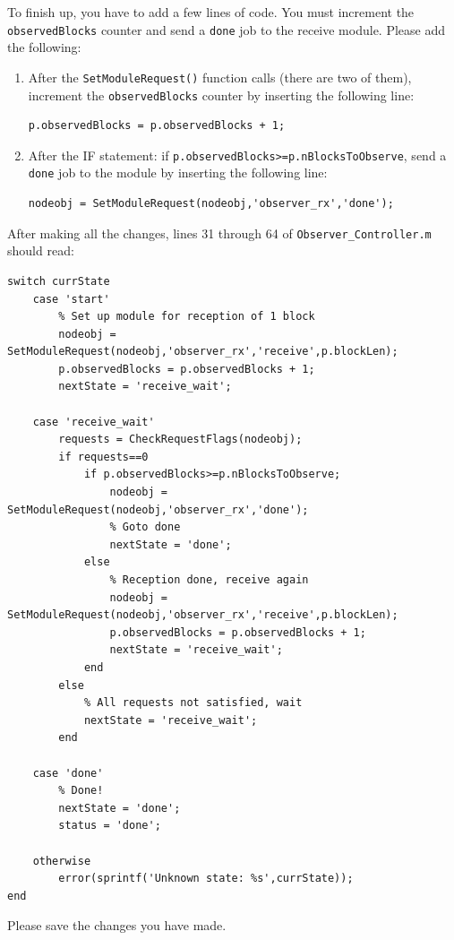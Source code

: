 To finish up, you have to add a few lines of code.  You must increment the \verb+observedBlocks+ counter and send a \verb+done+ job to the receive module.  Please add the following:
%
\setcounter{enumitemp}{\theenumi}
\begin{enumerate}
\setcounter{enumi}{\theenumitemp}
\item After the \verb+SetModuleRequest()+ function calls (there are two of them), increment the \verb+observedBlocks+ counter by inserting the following line:
%
\begin{lstlisting}[numbers=none]
p.observedBlocks = p.observedBlocks + 1;
\end{lstlisting}
%

\item After the IF statement: if \verb+p.observedBlocks>=p.nBlocksToObserve+, send a \verb+done+ job to the module by inserting the following line:
%
\begin{lstlisting}[numbers=none]
nodeobj = SetModuleRequest(nodeobj,'observer_rx','done');
\end{lstlisting}
%

\end{enumerate}
%
After making all the changes, lines 31 through 64 of \verb+Observer_Controller.m+ should read:
%
\begin{lstlisting}[firstnumber=31]
% State machine next-state and output "logic"
switch currState
    case 'start'
        % Set up module for reception of 1 block
        nodeobj = SetModuleRequest(nodeobj,'observer_rx','receive',p.blockLen);
        p.observedBlocks = p.observedBlocks + 1;
        nextState = 'receive_wait';

    case 'receive_wait'
        requests = CheckRequestFlags(nodeobj);
        if requests==0
            if p.observedBlocks>=p.nBlocksToObserve;
                nodeobj = SetModuleRequest(nodeobj,'observer_rx','done');
                % Goto done
                nextState = 'done';
            else
                % Reception done, receive again
                nodeobj = SetModuleRequest(nodeobj,'observer_rx','receive',p.blockLen);
                p.observedBlocks = p.observedBlocks + 1;
                nextState = 'receive_wait';
            end
        else
            % All requests not satisfied, wait
            nextState = 'receive_wait';
        end

    case 'done'
        % Done!
        nextState = 'done';
        status = 'done';

    otherwise
        error(sprintf('Unknown state: %s',currState));
end
\end{lstlisting}
%
Please save the changes you have made.

